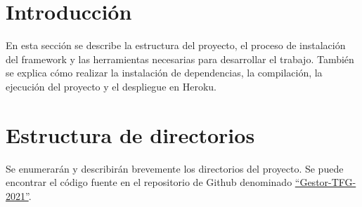 
\section{Introducción}
En esta sección se describe la estructura del proyecto, el proceso de instalación del framework y las herramientas necesarias para desarrollar el trabajo. También se explica cómo realizar la instalación de dependencias, la compilación, la ejecución del proyecto y el despliegue en Heroku.

\section{Estructura de directorios}
Se enumerarán y describirán brevemente los directorios del proyecto. Se puede encontrar el código fuente en el repositorio de Github denominado \href{https://github.com/dbo1001/Gestor-TFG-2021}{``Gestor-TFG-2021''}.

